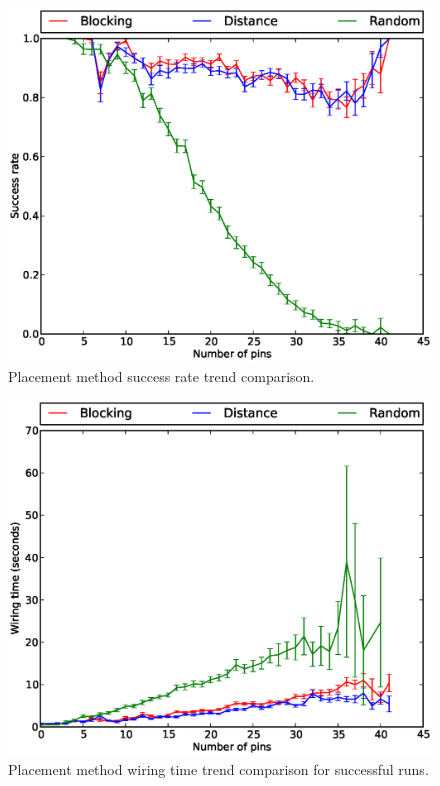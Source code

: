 \begin{figure}
\begin{center}
\includegraphics[width=\textwidth]{Images/placement_success_trend_comparison.eps}
\caption[Placement method success rate trend comparison]{Placement method
success rate trend comparison.}
\label{fig:placement_success_trend}
\end{center}
\end{figure}

\begin{figure}
\begin{center}
\includegraphics[width=\textwidth]{Images/placement_time_trend_comparison.eps}
\caption[Placement method wiring time trend comparison]{Placement method wiring
time trend comparison for successful runs.}
\label{fig:placement_time_trend}
\end{center}
\end{figure}

